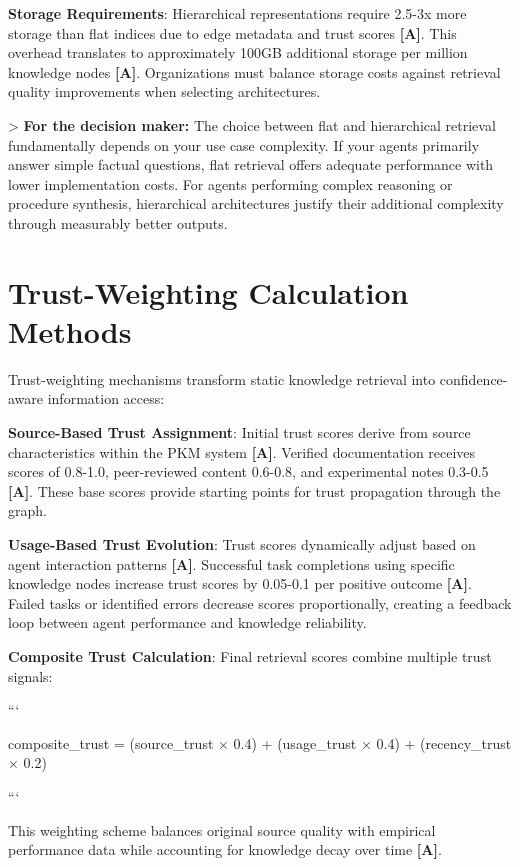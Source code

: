 \documentclass[a4paper,11pt]{article}
\newcommand{\alabel}{\textbf{\textcolor{acolor}{[A]}}}
\begin{document}
\textbf{Storage Requirements}: Hierarchical representations require 2.5-3x more storage than flat indices due to edge metadata and trust scores \alabel{}. This overhead translates to approximately 100GB additional storage per million knowledge nodes \alabel{}. Organizations must balance storage costs against retrieval quality improvements when selecting architectures.


> \textbf{For the decision maker:} The choice between flat and hierarchical retrieval fundamentally depends on your use case complexity. If your agents primarily answer simple factual questions, flat retrieval offers adequate performance with lower implementation costs. For agents performing complex reasoning or procedure synthesis, hierarchical architectures justify their additional complexity through measurably better outputs.


\section{Trust-Weighting Calculation Methods}

Trust-weighting mechanisms transform static knowledge retrieval into confidence-aware information access:


\textbf{Source-Based Trust Assignment}: Initial trust scores derive from source characteristics within the PKM system \alabel{}. Verified documentation receives scores of 0.8-1.0, peer-reviewed content 0.6-0.8, and experimental notes 0.3-0.5 \alabel{}. These base scores provide starting points for trust propagation through the graph.


\textbf{Usage-Based Trust Evolution}: Trust scores dynamically adjust based on agent interaction patterns \alabel{}. Successful task completions using specific knowledge nodes increase trust scores by 0.05-0.1 per positive outcome \alabel{}. Failed tasks or identified errors decrease scores proportionally, creating a feedback loop between agent performance and knowledge reliability.


\textbf{Composite Trust Calculation}: Final retrieval scores combine multiple trust signals:


```

composite\_trust = (source\_trust × 0.4) + (usage\_trust × 0.4) + (recency\_trust × 0.2)

```


This weighting scheme balances original source quality with empirical performance data while accounting for knowledge decay over time \alabel{}.
\end{document}
